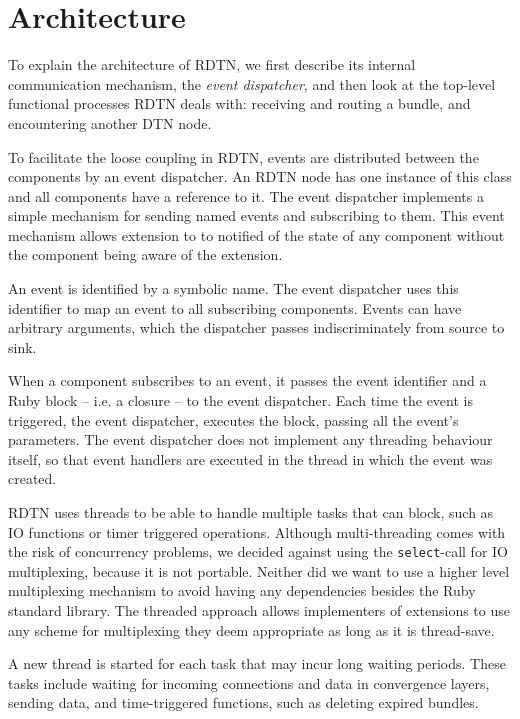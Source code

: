 \documentclass[a4paper]{article}
\begin{document}
\section{Architecture}\label{sec.arch}

To explain the architecture of RDTN, we first describe its internal
communication mechanism, the {\em event dispatcher}, and then look at the
top-level functional processes RDTN deals with: receiving and routing a bundle,
and encountering another DTN node.

To facilitate the loose coupling in RDTN, events are distributed between the
components by an event dispatcher. An RDTN node has one instance of this class
and all components have a reference to it.  The event dispatcher implements a
simple mechanism for sending named events and subscribing to them.  This event
mechanism allows extension to to notified of the state of any component without
the component being aware of the extension.

An event is identified by a symbolic name. The event dispatcher uses this
identifier to map an event to all subscribing components. Events can have
arbitrary arguments, which the dispatcher passes indiscriminately from source to
sink.

When a component subscribes to an event, it passes the event identifier and a
Ruby block -- i.e. a closure -- to the event dispatcher. Each time the event is
triggered, the event dispatcher, executes the block, passing all the event's
parameters.  The event dispatcher does not implement any threading behaviour
itself, so that event handlers are executed in the thread in which the event was
created.

RDTN uses threads to be able to handle multiple tasks that can block, such as IO
functions or timer triggered operations. Although multi-threading comes with the
risk of concurrency problems, we decided against using the {\tt select}-call for
IO multiplexing, because it is not portable. Neither did we want to use a higher
level multiplexing mechanism to avoid having any dependencies besides the Ruby
standard library. The threaded approach allows implementers of extensions to use
any scheme for multiplexing they deem appropriate as long as it is thread-save.

A new thread is started for each task that may incur long waiting periods. These
tasks include waiting for incoming connections and data in convergence layers,
sending data, and time-triggered functions, such as deleting expired bundles.
\end{document}
